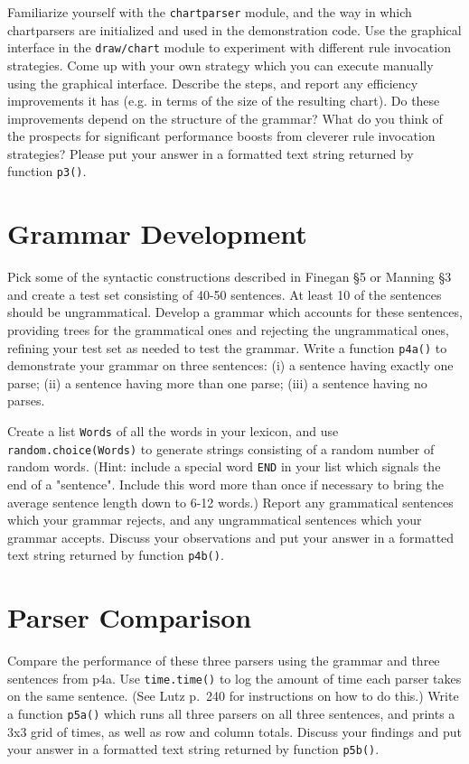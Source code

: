 \documentclass{cis530}
\begin{document}
Familiarize yourself with the \texttt{chartparser} module, and the way
in which chartparsers are initialized and used in the demonstration code.
Use the graphical interface in the \texttt{draw/chart} module to experiment
with different rule invocation strategies.  Come up with your own strategy
which you can execute manually using the graphical interface.  Describe the
steps, and report any efficiency improvements it has (e.g. in terms of the
size of the resulting chart).  Do these improvements depend on the structure
of the grammar?  What do you think of the prospects for significant performance
boosts from cleverer rule invocation strategies?  Please put your answer in a formatted
text string returned by function \texttt{p3()}.

\pagebreak

\section{Grammar Development}

Pick some of the syntactic constructions described in Finegan \S 5 or Manning \S 3
and create a test set consisting of 40-50 sentences.  At least 10 of the sentences
should be ungrammatical.  Develop a grammar which accounts for these sentences,
providing trees for the grammatical ones and rejecting the ungrammatical ones,
refining your test set as needed to test the grammar.  Write
a function \texttt{p4a()} to demonstrate your grammar on three sentences:
(i) a sentence having exactly one parse;
(ii) a sentence having more than one parse;
(iii) a sentence having no parses.

Create a list \texttt{Words} of all the words in your lexicon, and use
\texttt{random.choice(Words)} to generate strings consisting of a random
number of random words.
(Hint: include a special word \texttt{END} in your list which signals
the end of a "sentence".  Include this word more than once if necessary
to bring the average sentence length down to 6-12 words.)
Report any grammatical
sentences which your grammar rejects, and any ungrammatical sentences which
your grammar accepts.  Discuss your observations and put your answer in
a formatted text string returned by function \texttt{p4b()}.

\section{Parser Comparison}

Compare the performance of these three parsers using the grammar and
three sentences from p4a.  Use \texttt{time.time()} to log the amount
of time each parser takes on the same sentence.  (See Lutz p.~240 for
instructions on how to do this.)  Write a function \texttt{p5a()}
which runs all three parsers on all three sentences, and prints
a 3x3 grid of times, as well as row and column totals.
Discuss your findings and put your answer in
a formatted text string returned by function \texttt{p5b()}.
\end{document}
